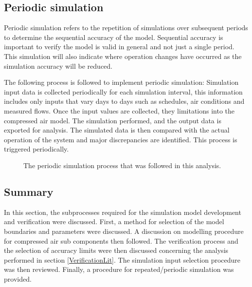 	\subsection{Periodic simulation}	
		Periodic simulation refers to the repetition of simulations over subsequent periods to determine the sequential accuracy of the model. Sequential accuracy is important to verify the model is valid in general and not just a single period. This simulation will also indicate where operation changes have occurred as the simulation accuracy will be reduced.
		\par 
		The following process is followed to implement periodic simulation: Simulation input data is collected periodically for each simulation interval, this information includes only inputs that vary days to days such as schedules, air conditions and measured flows. Once the input values are collected, they limitations into the compressed air model. The simulation performed, and the output data is exported for analysis. The simulated data is then compared with the actual operation of the system and major discrepancies are identified. This process is triggered periodically.
		\begin{figure}[h]
			\centering
			\caption{The periodic simulation process that was followed in this analysis.}
			\label{fig: PeriodicProcess}
		\end{figure}
	
	\subsection{Summary}	
In this section, the subprocesses required for the simulation model development and verification were discussed. First, a method for selection of the model boundaries and parameters were discussed. A discussion on modelling procedure for compressed air sub components then followed. The verification process and the selection of accuracy limits were then discussed concerning the analysis performed in section \cref{VerificationLit}. The simulation input selection procedure was then reviewed. Finally, a procedure for repeated/periodic simulation was provided.

